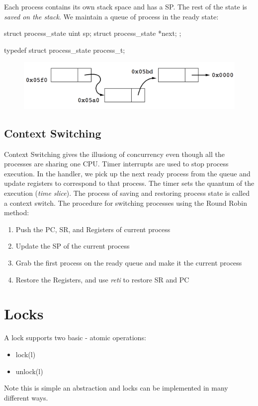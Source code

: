 \documentclass{hw}
\begin{document}
Each process contains its own stack space and has a SP. The rest of the state is
\emph{saved on the stack}. We maintain a queue of process in the ready state:
\begin{C}
struct process_state {
  uint sp;
  struct process_state *next;
};

typedef struct process_state process_t;
\end{C}

\begin{figure}[H]
  \centering
  \includegraphics[scale=.4]{img/queue}
\end{figure}

\subsection{Context Switching}
Context Switching gives the illusiong of concurrency even though
all the processes are sharing one CPU.
Timer interrupts are used to stop process execution. In the handler, we pick up
the next ready process from the queue and update registers to correspond to that
process. The timer sets the quantum of the execution (\emph{time slice}). The
process of saving and restoring process state is called a context switch.
The procedure for switching processes using the Round Robin method:

\begin{enumerate}
  \item Push the PC, SR, and Registers of current process
  \item Update the SP of the current process 
  \item Grab the first process on the ready queue and make it the current process
  \item Restore the Registers, and use \emph{reti} to restore SR and PC
\end{enumerate}


\section{Locks}
A lock supports two basic - atomic operations:
\begin{itemize}
  \item lock(l)
  \item unlock(l)
\end{itemize}
Note this is simple an abstraction and locks can be implemented in many 
different ways.
\end{document}
